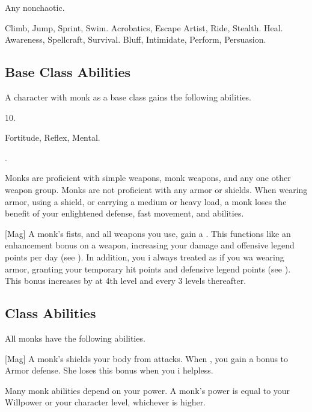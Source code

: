      Any nonchaotic.

     Climb, Jump, Sprint, Swim.
     Acrobatics, Escape Artist, Ride, Stealth.
     Heal.
     Awareness, Spellcraft, Survival.
     Bluff, Intimidate, Perform, Persuasion.

    \subsection{Base Class Abilities}
        A character with monk as a base class gains the following abilities.

         10.

          Fortitude,  Reflex,  Mental.

         .

        Monks are proficient with simple weapons, monk weapons, and any one other weapon group.
        Monks are not proficient with any armor or shields.
        When wearing armor, using a shield, or carrying a medium or heavy load, a monk loses the benefit of your enlightened defense, fast movement, and \ki abilities.

        [Mag] A monk's fists, and all weapons you use, gain a  .
        This functions like an enhancement bonus on a weapon, increasing your damage and offensive legend points per day (see ).
        In addition, you i always treated as if you wa wearing  armor, granting your temporary hit points and defensive legend points (see ).
        This bonus increases by  at 4th level and every 3 levels thereafter.

    \subsection{Class Abilities}
        All monks have the following abilities.

        [Mag]
        A monk's \ki shields your body from attacks.
        When \monkunencumbered, you gain a  bonus to Armor defense.
        She loses this bonus when you i helpless.

        Many monk abilities depend on your \ki power.
        A monk's \ki power is equal to your Willpower or your character level, whichever is higher.

